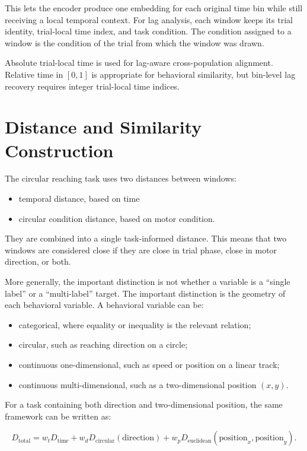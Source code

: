 \documentclass[11pt]{article}
\begin{document}
This lets the encoder produce one embedding for each original time bin while
still receiving a local temporal context. For lag analysis, each window keeps
its trial identity, trial-local time index, and task condition. The condition
assigned to a window is the condition of the trial from which the window was
drawn.

Absolute trial-local time is used for lag-aware cross-population alignment.
Relative time in $[0,1]$ is appropriate for behavioral similarity, but
bin-level lag recovery requires integer trial-local time indices.

\section{Distance and Similarity Construction}

The circular reaching task uses two distances between windows:

\begin{itemize}
    \item temporal distance, based on  time
    \item circular condition distance, based on motor condition.
\end{itemize}

They are combined into a single task-informed distance. This means that two
windows are considered close if they are close in trial phase, close in motor
direction, or both.

More generally, the important distinction is not whether a variable is a
``single label'' or a ``multi-label'' target. The important distinction is the
geometry of each behavioral variable. A behavioral variable can be:

\begin{itemize}
    \item categorical, where equality or inequality is the relevant relation;
    \item circular, such as reaching direction on a circle;
    \item continuous one-dimensional, such as speed or position on a linear
    track;
    \item continuous multi-dimensional, such as a two-dimensional position
    $(x,y)$.
\end{itemize}

For a task containing both direction and two-dimensional position, the same
framework can be written as:

\begin{equation}
D_{\text{total}} =
w_tD_{\text{time}}
+ w_dD_{\text{circular}}(\text{direction})
+ w_pD_{\text{euclidean}}(\text{position}_x,\text{position}_y).
\end{equation}
\end{document}
